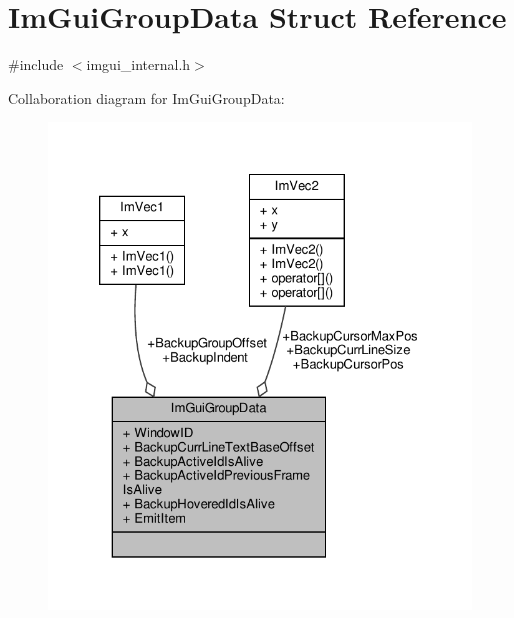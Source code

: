 \hypertarget{structImGuiGroupData}{}\section{Im\+Gui\+Group\+Data Struct Reference}
\label{structImGuiGroupData}


{\ttfamily \#include $<$imgui\+\_\+internal.\+h$>$}



Collaboration diagram for Im\+Gui\+Group\+Data\+:
\nopagebreak
\begin{figure}[H]
\begin{center}
\leavevmode
\includegraphics[width=326pt]{structImGuiGroupData__coll__graph}
\end{center}
\end{figure}
